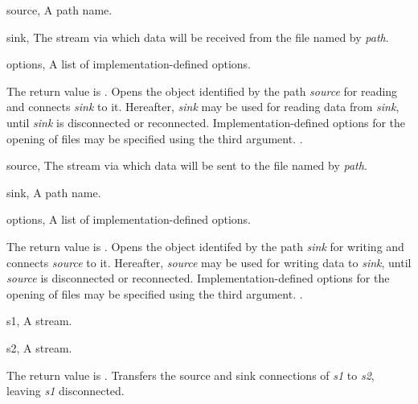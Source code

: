 \begin{optDefinition}
\begin{specargs}
    \item[source, \theclass{path}] A path name.
    \item[sink, \classref{file-stream}] The stream via which data will be
    received from the file named by {\em path}.
    \item[options, \classref{list}] A list of implementation-defined options.
\end{specargs}
%
\result%
The return value is \nil{}.
%
\remarks%
Opens the object identified by the path {\em source\/} for reading and
connects {\em sink\/} to it. Hereafter, {\em sink\/} may be used for reading
data from {\em sink\/}, until {\em sink\/} is disconnected or
reconnected. Implementation-defined options for the opening of files may be
specified using the third argument.
%
\seealso%
.

\begin{specargs}
    \item[source, \classref{file-stream}] The stream via which data will be sent
    to the file named by {\em path}.
    \item[sink, \theclass{path}] A path name.
    \item[options, \classref{list}] A list of implementation-defined options.
\end{specargs}
%
\result%
The return value is \nil{}.
%
\remarks%
Opens the object identifed by the path {\em sink\/} for writing and
connects {\em source\/} to it. Hereafter, {\em source\/} may be used for writing
data to {\em sink}, until {\em source\/} is disconnected or
reconnected. Implementation-defined options for the opening of files may be
specified using the third argument.
%
\seealso%
.

\begin{genericargs}
    \item[s1, \classref{stream}] A stream.
    \item[s2, \classref{stream}] A stream.
\end{genericargs}
%
\result%
The return value is \nil{}.
%
\remarks%
Transfers the source and sink connections of {\em s1\/} to {\em s2},
leaving {\em s1\/} disconnected.


\end{optDefinition}
